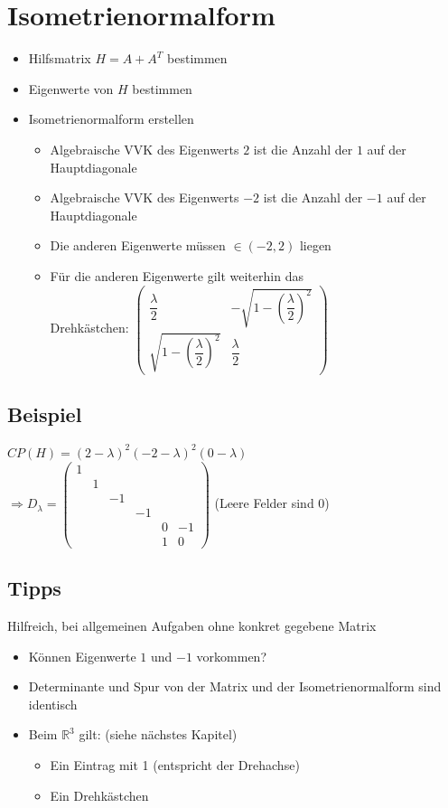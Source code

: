 \documentclass[a4paper,portrait]{scrartcl}
\begin{document}
\section{Isometrienormalform}
\begin{itemize}
	\item Hilfsmatrix $H = A+A^T$ bestimmen
	\item Eigenwerte von $H$ bestimmen
	\item Isometrienormalform erstellen
	\begin{itemize}
	
		\item Algebraische VVK des Eigenwerts $2$ ist die Anzahl der $1$ auf der Hauptdiagonale
		\item Algebraische VVK des Eigenwerts $-2$ ist die Anzahl der $-1$ auf der Hauptdiagonale
		\item Die anderen Eigenwerte müssen $\in (-2,2)$ liegen
		\item Für die anderen Eigenwerte gilt weiterhin das \\ 
			Drehkästchen: $\begin{pmatrix}
			\dfrac{\lambda}{2} & -\sqrt{1-(\dfrac{\lambda}{2})^2}\\
			\sqrt{1-(\dfrac{\lambda}{2})^2} & \dfrac{\lambda}{2}
			\end{pmatrix}$
	\end{itemize}
\end{itemize}
\subsection*{Beispiel}
$CP(H) = (2-\lambda)^2(-2-\lambda)^2(0-\lambda)$ \\
$\Rightarrow D_\lambda = 
\begin{pmatrix}
1&&&&&\\
&1&&&&\\
&&-1&&&\\
&&&-1&&\\
&&&&0&-1\\
&&&&1&0
\end{pmatrix}
$ (Leere Felder sind $0$)
\subsection{Tipps}
Hilfreich, bei allgemeinen Aufgaben ohne konkret gegebene Matrix
\begin{itemize}
	\item Können Eigenwerte $1$ und $-1$ vorkommen?
	\item Determinante und Spur von der Matrix und der Isometrienormalform sind identisch
	\item Beim $\mathbb{R}^3$ gilt: (siehe nächstes Kapitel)
	\begin{itemize}
		\item Ein Eintrag mit 1 (entspricht der Drehachse)
		\item Ein Drehkästchen
	\end{itemize}
\end{itemize}
\end{document}
